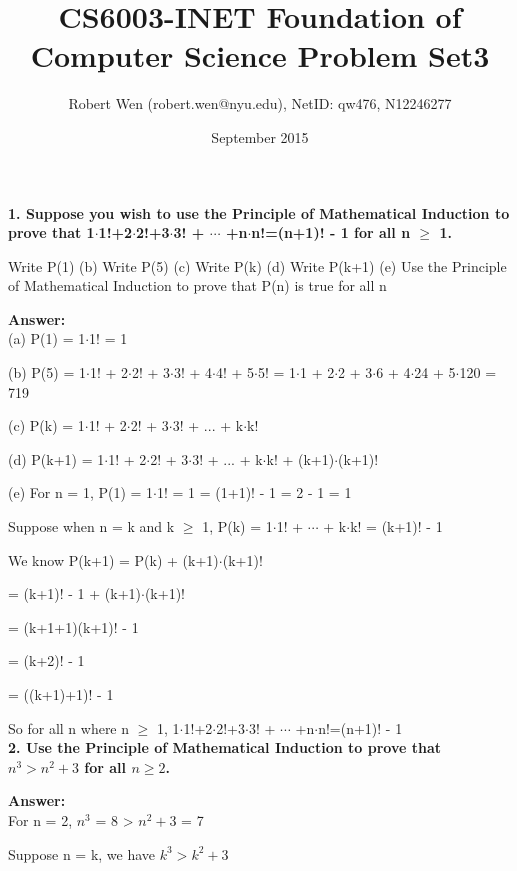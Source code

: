 \documentclass{article}
\title{CS6003-INET Foundation of Computer Science Problem Set3}
\author{Robert Wen (robert.wen@nyu.edu), NetID: qw476, N12246277}
\date{September 2015}
\begin{document}
\begin{large}

\maketitle


\textbf{1. Suppose you wish to use the Principle of Mathematical Induction to prove that
1$\cdot$1!+2$\cdot$2!+3$\cdot$3! + $\cdots$ +n$\cdot$n!=(n+1)! - 1 for all n $\ge$ 1.}

Write P(1) (b) Write P(5) (c) Write P(k) (d) Write P(k+1) (e) Use the Principle of Mathematical Induction to prove that P(n) is true for all n

\textbf{Answer:}\\

(a) P(1) = 1$\cdot$1! = 1

(b) P(5) = 1$\cdot$1! + 2$\cdot$2! + 3$\cdot$3! + 4$\cdot$4! + 5$\cdot$5!
         = 1$\cdot$1  + 2$\cdot$2  + 3$\cdot$6  + 4$\cdot$24 + 5$\cdot$120
         = 719

(c) P(k) = 1$\cdot$1! + 2$\cdot$2! + 3$\cdot$3! + ... + k$\cdot$k!

(d) P(k+1) = 1$\cdot$1! + 2$\cdot$2! + 3$\cdot$3! + ... + k$\cdot$k! + (k+1)$\cdot$(k+1)!

(e) For n = 1, P(1) = 1$\cdot$1! = 1 = (1+1)! - 1 = 2 - 1 = 1

\indent    Suppose when n = k and k $\ge$ 1, P(k) = 1$\cdot$1! + $\cdots$ + k$\cdot$k! = (k+1)! - 1

\indent    We know P(k+1) = P(k) + (k+1)$\cdot$(k+1)! 

\indent \indent           = (k+1)! - 1 + (k+1)$\cdot$(k+1)!

\indent \indent           = (k+1+1)(k+1)! - 1

\indent \indent           = (k+2)! - 1

\indent \indent           = ((k+1)+1)! - 1

\indent    So for all n where n $\ge$ 1, 1$\cdot$1!+2$\cdot$2!+3$\cdot$3! + $\cdots$ +n$\cdot$n!=(n+1)! - 1\\

\textbf{2. Use the Principle of Mathematical Induction to prove that $n^{3}>n^{2}+3$ for all $n\ge 2$.} 

\textbf{Answer:}\\

For n = 2, $n^3$ = 8 > $n^{2} + 3$ = 7

Suppose n = k, we have $k^{3} > k^{2} + 3$


\end{large}
\end{document}
